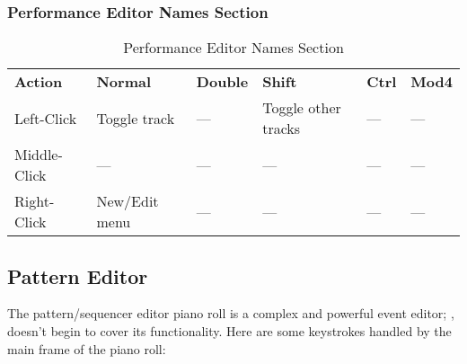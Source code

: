 \subsubsection{Performance Editor Names Section}
\label{subsubsec:kbd_mouse_performance_editor_names_section}

   \begin{table}[H]
      \centering
      \caption{Performance Editor Names Section}
      \label{table:performance_editor_names}
      \begin{tabular}{l l l l l l}
         \textbf{Action}   & \textbf{Normal}    & \textbf{Double}    & \textbf{Shift}        & \textbf{Ctrl}   & \textbf{Mod4}      \\
         Left-Click        & Toggle track       & ---                & Toggle other tracks   & ---             & ---                \\
         Middle-Click      & ---                & ---                & ---                   & ---             & ---                \\
         Right-Click       & New/Edit menu      & ---                & ---                   & ---             & ---                \\
      \end{tabular}
   \end{table}

\subsection{Pattern Editor}
\label{subsec:kbd_mouse_pattern_editor}

   The pattern/sequencer editor piano roll is a complex and powerful event
   editor;
   ,
   doesn't begin to cover its functionality.
   Here are some keystrokes handled by the main frame of the piano roll:

